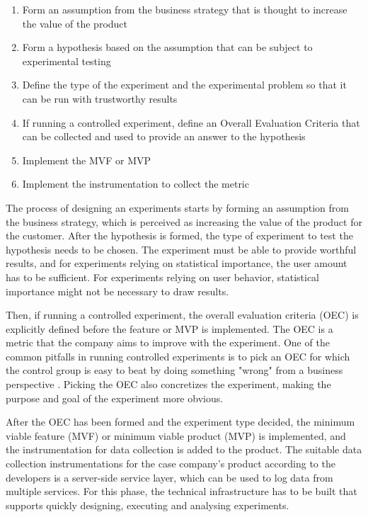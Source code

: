 \documentclass[english]{tktltiki2}
\theoremstyle{definition}
\theoremstyle{remark}
\begin{document}
\begin{enumerate}
  \item Form an assumption from the business strategy that is thought to increase the value of the product
  \item Form a hypothesis based on the assumption that can be subject to experimental testing 
  \item Define the type of the experiment and the experimental problem so that it can be run with trustworthy results
  \item If running a controlled experiment, define an Overall Evaluation Criteria that can be collected and used to provide an answer to the hypothesis  
  \item Implement the MVF or MVP
  \item Implement the instrumentation to collect the metric
\end{enumerate}

The process of designing an experiments starts by forming an assumption from the business strategy, which is perceived as increasing the value of the product for the customer. After the hypothesis is formed, the type of experiment to test the hypothesis needs to be chosen. The experiment must be able to provide worthful results, and for experiments relying on statistical importance, the user amount has to be sufficient. For experiments relying on user behavior, statistical importance might not be necessary to draw results.

Then, if running a controlled experiment, the overall evaluation criteria (OEC) is explicitly defined before the feature or MVP is implemented. The OEC is a metric that the company aims to improve with the experiment. One of the common pitfalls in running controlled experiments is to pick an OEC for which the control group is easy to beat by doing something "wrong" from a business perspective \cite{crook2009seven}. Picking the OEC also concretizes the experiment, making the purpose and goal of the experiment more obvious. 

After the OEC has been formed and the experiment type decided, the minimum viable feature (MVF) or minimum viable product (MVP) is implemented, and the instrumentation for data collection is added to the product. The suitable data collection instrumentations for the case company's product according to the developers is a server-side service layer, which can be used to log data from multiple services. For this phase, the technical infrastructure has to be built that supports quickly designing, executing and analysing experiments.  
\end{document}
